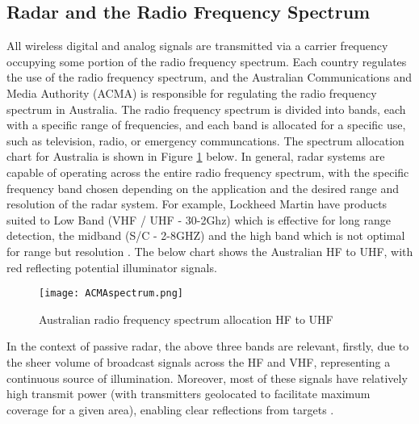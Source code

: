 \subsection{Radar and the Radio Frequency Spectrum}
All wireless digital and analog signals are transmitted via a carrier frequency occupying some portion of the radio frequency spectrum. Each country regulates the use of the radio frequency spectrum, and the Australian Communications and Media Authority (ACMA) is responsible for regulating the radio frequency spectrum in Australia. The radio frequency spectrum is divided into bands, each with a specific range of frequencies, and each band is allocated for a specific use, such as television, radio, or emergency communcations. The spectrum allocation chart for Australia is shown in Figure \ref{fig:radioSpectrum} below. In general, radar systems are capable of operating across the entire radio frequency spectrum, with the specific frequency band chosen depending on the application and the desired range and resolution of the radar system. For example, Lockheed Martin have products suited to Low Band (VHF / UHF - 30-2Ghz) which is effective for long range detection, the midband (S/C - 2-8GHZ) and the high band which is not optimal for range but resolution \cite{LockheedRadar}. The below chart shows the Australian HF to UHF, with red reflecting potential illuminator signals.

\begin{figure}[htbp]
    \centering
    \texttt{[image: ACMAspectrum.png]}
    \caption{Australian radio frequency spectrum allocation HF to UHF \cite{SpectrumImage}}
    \label{fig:radioSpectrum}
\end{figure}

In the context of passive radar, the above three bands are relevant, firstly, due to the sheer volume of broadcast signals across the HF and VHF, representing a continuous source of illumination. Moreover, most of these signals have relatively high transmit power (with transmitters geolocated to facilitate maximum coverage for a given area), enabling clear reflections from targets \cite{DTSO2009}.

